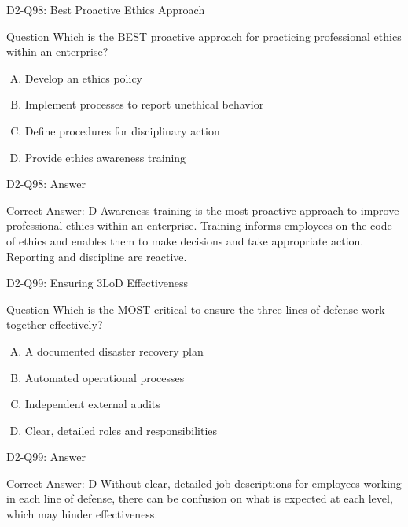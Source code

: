 \documentclass{beamer}
\begin{document}
	\begin{frame}{D2-Q98: Best Proactive Ethics Approach}
		\begin{block}{Question}
			Which is the BEST proactive approach for practicing professional ethics within an enterprise?
		\end{block}
		\begin{enumerate}[(A)]
			\item Develop an ethics policy
			\item Implement processes to report unethical behavior
			\item Define procedures for disciplinary action
			\item Provide ethics awareness training
		\end{enumerate}
	\end{frame}
	\begin{frame}{D2-Q98: Answer}
		\begin{block}{Correct Answer: D}
			Awareness training is the most proactive approach to improve professional ethics within an enterprise. Training informs employees on the code of ethics and enables them to make decisions and take appropriate action. Reporting and discipline are reactive.
		\end{block}
	\end{frame}
	
	\begin{frame}{D2-Q99: Ensuring 3LoD Effectiveness}
		\begin{block}{Question}
			Which is the MOST critical to ensure the three lines of defense work together effectively?
		\end{block}
		\begin{enumerate}[(A)]
			\item A documented disaster recovery plan
			\item Automated operational processes
			\item Independent external audits
			\item Clear, detailed roles and responsibilities
		\end{enumerate}
	\end{frame}
	\begin{frame}{D2-Q99: Answer}
		\begin{block}{Correct Answer: D}
			Without clear, detailed job descriptions for employees working in each line of defense, there can be confusion on what is expected at each level, which may hinder effectiveness.
		\end{block}
	\end{frame}
	
\end{document}
